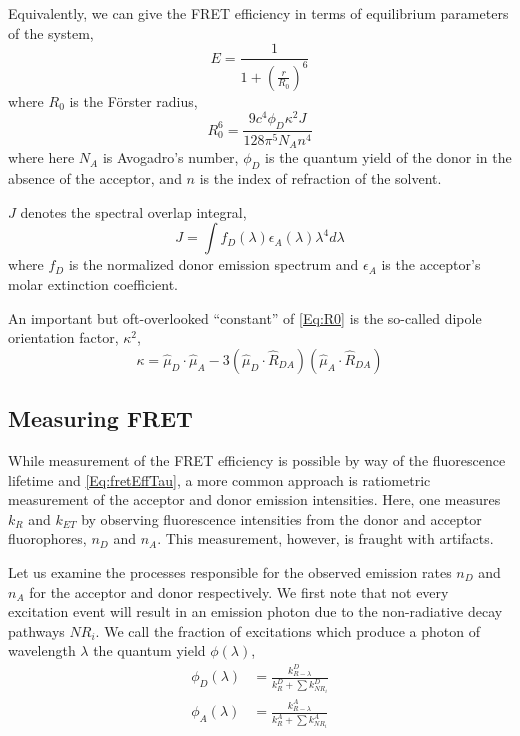 \documentclass{article}
\newcommand{\NR}{\ensuremath{\mathit{NR}}}          %
\newcommand{\ET}{\ensuremath{\mathit{ET}}}          %
\begin{document}
Equivalently, we can give the FRET efficiency in terms of equilibrium
parameters of the system,
\begin{equation}
  E = \frac{1}{1 + \left( \frac{r}{R_0} \right)^6}
  \label{Eq:fretEff}
\end{equation}
where $R_0$ is the F\"orster radius,
\begin{equation}
  R_0^6 = \frac{9 c^4 \phi_D \kappa^2 J}{128 \pi^5 N_A n^4}
  \label{Eq:R0}
\end{equation}
where here $N_A$ is Avogadro's number, $\phi_D$ is the quantum yield of the
donor in the absence of the acceptor, and $n$ is the index of
refraction of the solvent.

$J$ denotes the spectral overlap integral,
\[ J = \int f_D(\lambda) \epsilon_A(\lambda) \lambda^4 d\lambda \]
where $f_D$ is the normalized donor emission spectrum and $\epsilon_A$
is the acceptor's molar extinction coefficient.

An important but oft-overlooked ``constant'' of \eqref{Eq:R0} is
the so-called dipole orientation factor, $\kappa^2$,
\begin{equation}
  \kappa = \hat\mu_D \cdot \hat\mu_A - 3(\hat\mu_D \cdot \hat R_{DA}) (\hat\mu_A \cdot \hat R_{DA})
  \label{Eq:kappa}
\end{equation}

\subsection{Measuring FRET}
While measurement of the FRET efficiency is possible by way of the
fluorescence lifetime and \eqref{Eq:fretEffTau}, a more common
approach is ratiometric measurement of the acceptor and donor emission
intensities\cite{Dahan1999}. Here, one measures $k_R$ and $k_\ET$ by observing
fluorescence intensities from the donor and acceptor fluorophores,
$n_D$ and $n_A$. This measurement, however, is fraught with
artifacts.

Let us examine the processes responsible for the observed emission rates
$n_D$ and $n_A$ for the acceptor and donor respectively. We first note
that not every excitation event will result in an emission photon due
to the non-radiative decay pathways $\NR_i$. We call the fraction of
excitations which produce a photon of wavelength $\lambda$ the quantum
yield $\phi(\lambda)$,
\begin{align*}
  \phi_D(\lambda) & = \frac{k^D_{R-\lambda}}{k^D_R + \sum k^D_{\NR_i}} \\
  \phi_A(\lambda) & = \frac{k^A_{R-\lambda}}{k^A_R + \sum k^A_{\NR_i}} \\
\end{align*}
\end{document}
